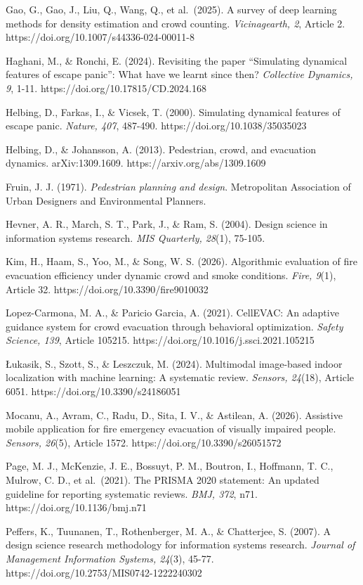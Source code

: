 \documentclass[
]{article}
\begin{document}
Gao, G., Gao, J., Liu, Q., Wang, Q., et al.~(2025). A survey of deep
learning methods for density estimation and crowd counting.
\emph{Vicinagearth, 2}, Article 2.
https://doi.org/10.1007/s44336-024-00011-8

Haghani, M., \& Ronchi, E. (2024). Revisiting the paper ``Simulating
dynamical features of escape panic'': What have we learnt since then?
\emph{Collective Dynamics, 9}, 1-11.
https://doi.org/10.17815/CD.2024.168

Helbing, D., Farkas, I., \& Vicsek, T. (2000). Simulating dynamical
features of escape panic. \emph{Nature, 407}, 487-490.
https://doi.org/10.1038/35035023

Helbing, D., \& Johansson, A. (2013). Pedestrian, crowd, and evacuation
dynamics. arXiv:1309.1609. https://arxiv.org/abs/1309.1609

Fruin, J. J. (1971). \emph{Pedestrian planning and design}. Metropolitan
Association of Urban Designers and Environmental Planners.

Hevner, A. R., March, S. T., Park, J., \& Ram, S. (2004). Design science
in information systems research. \emph{MIS Quarterly, 28}(1), 75-105.

Kim, H., Haam, S., Yoo, M., \& Song, W. S. (2026). Algorithmic
evaluation of fire evacuation efficiency under dynamic crowd and smoke
conditions. \emph{Fire, 9}(1), Article 32.
https://doi.org/10.3390/fire9010032

Lopez-Carmona, M. A., \& Paricio Garcia, A. (2021). CellEVAC: An
adaptive guidance system for crowd evacuation through behavioral
optimization. \emph{Safety Science, 139}, Article 105215.
https://doi.org/10.1016/j.ssci.2021.105215

Łukasik, S., Szott, S., \& Leszczuk, M. (2024). Multimodal image-based
indoor localization with machine learning: A systematic review.
\emph{Sensors, 24}(18), Article 6051. https://doi.org/10.3390/s24186051

Mocanu, A., Avram, C., Radu, D., Sita, I. V., \& Astilean, A. (2026).
Assistive mobile application for fire emergency evacuation of visually
impaired people. \emph{Sensors, 26}(5), Article 1572.
https://doi.org/10.3390/s26051572

Page, M. J., McKenzie, J. E., Bossuyt, P. M., Boutron, I., Hoffmann, T.
C., Mulrow, C. D., et al.~(2021). The PRISMA 2020 statement: An updated
guideline for reporting systematic reviews. \emph{BMJ, 372}, n71.
https://doi.org/10.1136/bmj.n71

Peffers, K., Tuunanen, T., Rothenberger, M. A., \& Chatterjee, S.
(2007). A design science research methodology for information systems
research. \emph{Journal of Management Information Systems, 24}(3),
45-77. https://doi.org/10.2753/MIS0742-1222240302
\end{document}
